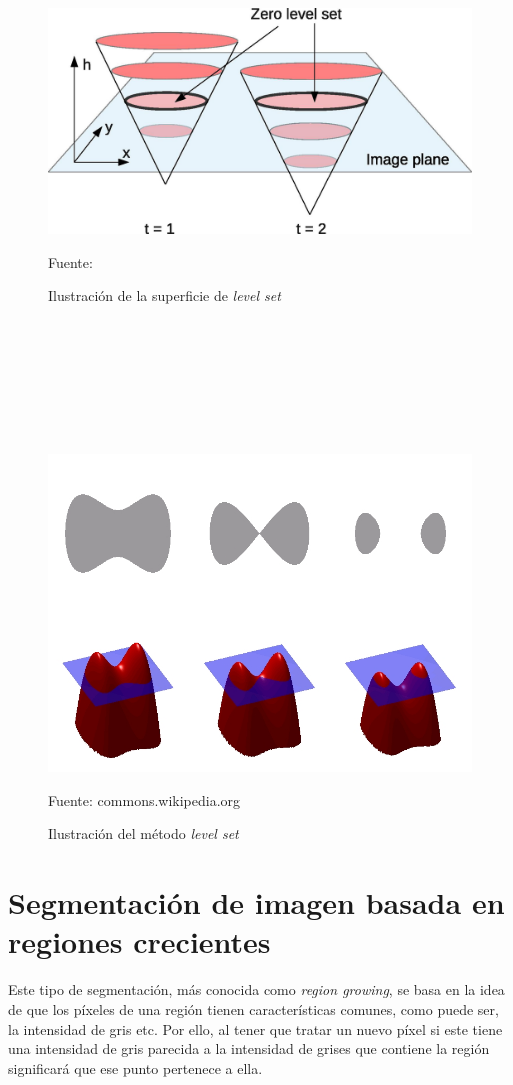 \begin{figure}[H]
	\captionsetup{justification=centering}
	\centering
	\includegraphics[width=.7\textwidth]{./imagenes/levelSet1}
	\caption{Ilustraci\'{o}n de la superficie de \textit{level set}}
	\vspace{2 mm}
	Fuente: \cite{eri2015}
	\label{levelSet1}
\end{figure}
\

\

\

\

\begin{figure}[H]
	\captionsetup{justification=centering}
	\centering
	\includegraphics[width=.7\textwidth]{./imagenes/levelSet2}
	\caption{Ilustraci\'{o}n del m\'{e}todo \textit{level set}}
	\vspace{2 mm}
	Fuente: commons.wikipedia.org
	\label{levelSet2}
\end{figure}

\section{Segmentaci\'{o}n de imagen basada en regiones crecientes}\label{cap:segRegiCreci}

Este tipo de segmentaci\'{o}n, m\'{a}s conocida como \textit{region growing}, se basa en la idea de que los p\'{i}xeles de una regi\'{o}n tienen caracter\'{i}sticas comunes, como puede ser, la intensidad de gris etc. Por ello, al tener que tratar un nuevo p\'{i}xel si este tiene una intensidad de gris parecida a la intensidad de grises que contiene la regi\'{o}n significar\'{a} que ese punto pertenece a ella. 

